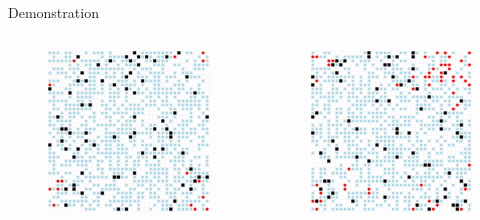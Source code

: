 \documentclass[10pt]{beamer}
\begin{document}
    \begin{frame}{Demonstration}

        \begin{columns}
            \begin{column}{.3\textwidth}
                \begin{figure}
                    \centering
                    \includegraphics[width=.9\textwidth]{pictures/demonstration/spread_1.png}
                \end{figure}
            \end{column}
            \begin{column}{.3\textwidth}
                \begin{figure}
                    \centering
                    \includegraphics[width=.9\textwidth]{pictures/demonstration/spread_2.png}

\end{figure}
\end{column}
\end{columns}
\end{frame}
\end{document}
